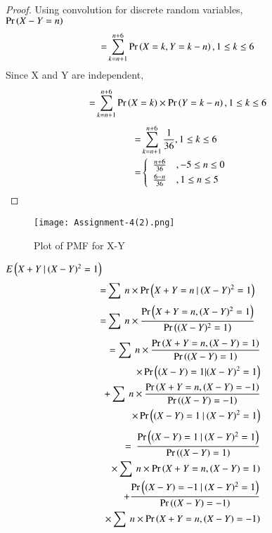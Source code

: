 \documentclass[journal,12pt,twocolumn]{IEEEtran}
\begin{document}
\begin{proof}
Using convolution for discrete random variables,\\
$\Pr\left(X-Y=n\right)$
\begin{align}
    =&\sum_{k=n+1}^{n+6} \Pr\left(X=k,Y=k-n\right), 1\leq k \leq 6
\end{align}
Since X and Y are independent,
\begin{align}
    =&\sum_{k=n+1}^{n+6} \Pr\left(X=k\right)\times\Pr\left(Y=k-n\right), 1\leq k \leq 6
\end{align}
\begin{align}
    =&\sum_{k=n+1}^{n+6} \frac{1}{36}, 1\leq k \leq 6\\
    =&
    \left\{
	        \begin{array}{ll}
		    \frac{n+6}{36} & , -5 \leq n \leq 0 \smallskip\\
		    \frac{6-n}{36} & , 1  \leq n \leq 5
	        \end{array}
    \right.\label{0.0.12}
\end{align}
\end{proof}
\begin{figure}[htb]
    \texttt{[image: Assignment-4(2).png]}
    \caption{Plot of PMF for X-Y}
\end{figure}
$E\left(X+Y\:|\:(X-Y)^2=1\right)$
\begin{align}
    =&\sum\:n\times\Pr\left(X+Y=n\:|\:(X-Y)^2=1\right)
\end{align}
\begin{align}
    =&\sum\:n\times\frac{\Pr\left(X+Y=n,(X-Y)^2=1\right)}{\Pr\left((X-Y)^2=1\right)}
\end{align}
\begin{align}
    \begin{split}
        =\sum\:n\times\frac{\Pr\brak{X+Y=n,(X-Y)=1}}{\Pr\brak{(X-Y)=1}}
        \bigskip\\
        \times\Pr\brak{(X-Y)=1|(X-Y)^2=1}
        \bigskip\\
        +\sum\:n\times\frac{\Pr\brak{X+Y=n,(X-Y)=-1}}{\Pr\brak{(X-Y)=-1}}
        \bigskip\\
        \times\Pr\brak{(X-Y)=1\:|\:(X-Y)^2=1}
    \end{split}
\end{align}
\begin{align}
    \begin{split}
        =\:\frac{\Pr\brak{(X-Y)=1\:|\:(X-Y)^2=1}}{\Pr\brak{(X-Y)=1}}
        \bigskip\\
        \times\sum\:n\times\Pr\brak{X+Y=n,(X-Y)=1}
        \bigskip\\
        +\frac{\Pr\brak{(X-Y)=-1\:|\:(X-Y)^2=1}}{\Pr\brak{(X-Y)=-1}}
        \bigskip\\
        \times\sum\:n\times\Pr\brak{X+Y=n,(X-Y)=-1}\label{0.0.16}
    \end{split}
\end{align}
\end{document}
